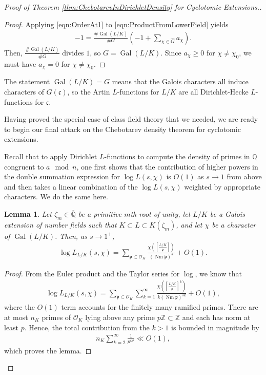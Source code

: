 \documentclass[12pt]{amsart}
\newtheorem{lem}[thm]{Lemma}
\theoremstyle{definition}
\theoremstyle{remark}
\numberwithin{equation}{section}
\newcommand{\cO}{\mathcal O}
\newcommand{\fkc}{\mathfrak c}
\newcommand{\fkp}{\mathfrak p}
\newcommand{\bbQ}{\mathbb Q}
\newcommand{\bbZ}{\mathbb Z}
\DeclareMathOperator{\norm}{Nm}
\newcommand{\artin}[2]{\left[ \frac{#1}{#2}\right]}
\DeclareMathOperator{\Gal}{Gal}
\begin{document}
\begin{proof}[Proof of Theorem \ref{thm:ChebotarevInDirichletDensity} for Cyclotomic Extensions.]
\begin{proof}
Applying \eqref{eqn:OrderAt1} to \eqref{eqn:ProductFromLowerField} yields
\begin{align}
-1 = \frac{\# \Gal(L/K)}{\# G} \left( -1 + \sum_{\chi \in \widehat{G}} a_{\chi} \right).
\end{align}
Then, $\frac{\# \Gal(L/K)}{\# G}$ divides $1$, so $G = \Gal(L/K)$. Since $a_{\chi} \geq 0$ for $\chi \neq \chi_{0}$, we must have $a_{\chi} = 0$ for $\chi \neq \chi_{0}$.
\end{proof}
The statement $\Gal(L/K) = G$ means that the Galois characters all induce characters of $G(\fkc)$, so the Artin $L$-functions for $L/K$ are all Dirichlet-Hecke $L$-functions for $\fkc$.

Having proved the special case of class field theory that we needed, we are ready to begin our final attack on the Chebotarev density theorem for cyclotomic extensions.

Recall that to apply Dirichlet $L$-functions to compute the density of primes in $\bbQ$ congruent to $a \mod n$, one first shows that the contribution of higher powers in the double summation expression for $\log L(s,\chi)$ is $O(1)$ as $s \to 1$ from above and then takes a linear combination of the $\log L(s,\chi)$ weighted by appropriate characters. We do the same here.

\begin{lem} \label{lem:LFunctionsAndSumsOverPrimes}
Let $\zeta_{m} \in \overline{\bbQ}$ be a primitive $m$th root of unity, let $L/K$ be a Galois extension of number fields such that $K \subset L \subset K(\zeta_{m})$, and let $\chi$ be a character of $\Gal(L/K)$. Then, as $s \to 1^+$,
\begin{align}
\log L_{L/K}(s, \chi) = \sum_{\fkp \subset \cO_{K}} \frac{\chi\left(\artin{L/K}{\fkp}\right)}{(\norm \fkp)^{s}} + O(1).
\end{align}
\end{lem}
\begin{proof}
From the Euler product and the Taylor series for $\log$, we know that
\begin{align}
\log L_{L/K}(s,\chi) = \sum_{\fkp \subset \cO_{K}} \sum_{k =1}^{\infty} \frac{\chi\left(\artin{L/K}{\fkp}^{k}\right)}{k(\norm \fkp)^{sk}} + O(1), 
\end{align}
where the $O(1)$ term accounts for the finitely many ramified primes. There are at most $n_{K}$ primes of $\cO_{K}$ lying above any prime $p\bbZ \subset \bbZ$ and each has norm at least $p$. Hence, the total contribution from the $k > 1$ is bounded in magnitude by 
\begin{align}
n_{K} \sum_{k =2}^{\infty} \frac{1}{p^{k\sigma}} \ll O(1),
\end{align}
which proves the lemma.
\end{proof}


\end{proof}
\end{document}
